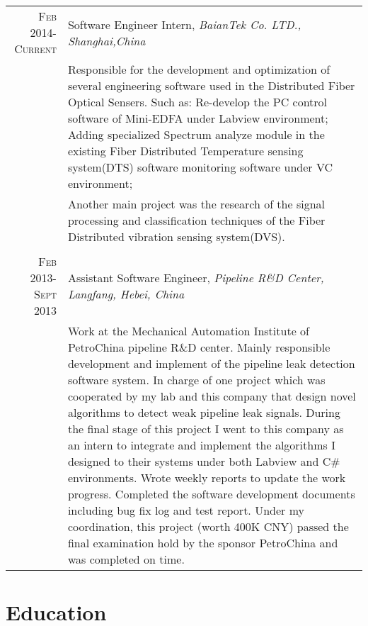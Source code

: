 \documentclass[a4paper,10pt]{article} %
\begin{document}
\begin{tabular}{r|p{11cm}}

\textsc{Feb 2014-Current} & Software Engineer Intern, \emph{BaianTek Co. LTD., \footnotesize{Shanghai,China}}\\
& \footnotesize{Responsible for the development and optimization of several engineering software used in the Distributed Fiber Optical Sensers. Such as: Re-develop the PC control software of Mini-EDFA under Labview environment; Adding specialized Spectrum analyze module in the existing Fiber Distributed Temperature sensing system(DTS) software monitoring software under VC environment;} \\
& \footnotesize{Another main project was the research of the signal processing and classification techniques of the Fiber Distributed vibration sensing system(DVS).   }\\
\multicolumn{2}{c}{} \\


\textsc{Feb 2013-Sept 2013} & Assistant Software Engineer, \emph{Pipeline R\&D Center, \footnotesize{Langfang, Hebei, China}}\\
& \footnotesize{Work at the Mechanical Automation Institute of PetroChina pipeline R\&D center. Mainly responsible development and implement of the pipeline leak detection software system. In charge of one project which was cooperated by my lab and this company that design novel algorithms to detect weak pipeline leak signals. During the final stage of this project I went to this company as an intern to integrate and implement the algorithms I designed to their systems under both Labview and C\# environments. Wrote weekly reports to update the work progress. Completed the software development documents including bug fix log and test report. Under my coordination, this project (worth 400K CNY) passed the final examination hold by the sponsor PetroChina and was completed on time.}


\end{tabular}


\section{Education}
\end{document}
